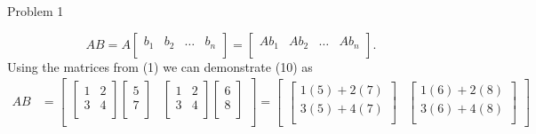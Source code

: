 \begin{problem}{Problem 1}
\begin{highlight}[Solution]
        \begin{equation}
            AB = A 
            \begin{bmatrix}
                b_{1} & b_{2} & \dots & b_{n} \\
            \end{bmatrix}
            = 
            \begin{bmatrix}
                Ab_{1} & Ab_{2} & \dots & Ab_{n} \\
            \end{bmatrix}.
        \end{equation}
        Using the matrices from (1) we can demonstrate (10) as 
        \begin{align*}
            AB & =
            \begin{bmatrix}
                \begin{bmatrix}
                    1 & 2 \\
                    3 & 4 \\
                \end{bmatrix}
                \begin{bmatrix}
                    5 \\
                    7 \\
                \end{bmatrix} & 
                \begin{bmatrix}
                    1 & 2 \\
                    3 & 4 \\
                \end{bmatrix}
                \begin{bmatrix}
                    6 \\
                    8 \\
                \end{bmatrix} \\
            \end{bmatrix}
            = 
            \begin{bmatrix}
                \begin{bmatrix}
                    1(5) + 2(7) \\
                    3(5) + 4(7) \\
                \end{bmatrix} &
                \begin{bmatrix}
                    1(6) + 2(8) \\
                    3(6) + 4(8) \\

\end{bmatrix}
\end{bmatrix}
\end{align*}
\end{highlight}
\end{problem}
